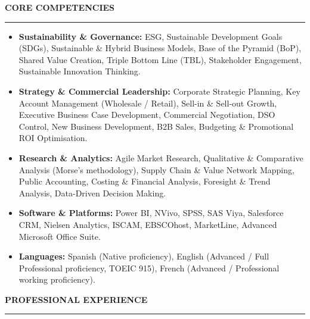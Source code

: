 \documentclass[10pt,a4paper]{article}
\newcommand{\cvsection}[1]{%
  \vspace{0.6em}%
  {\large\bfseries #1}\par
  \vspace{-0.45em}%
  \rule{\textwidth}{0.6pt}\par
  \vspace{0.25em}%
}
\begin{document}
\cvsection{CORE COMPETENCIES}
\begin{itemize}
  \item \textbf{Sustainability \& Governance:} ESG, Sustainable Development Goals (SDGs), Sustainable \& Hybrid Business Models, Base of the Pyramid (BoP), Shared Value Creation, Triple Bottom Line (TBL), Stakeholder Engagement, Sustainable Innovation Thinking.
  \item \textbf{Strategy \& Commercial Leadership:} Corporate Strategic Planning, Key Account Management (Wholesale / Retail), Sell-in \& Sell-out Growth, Executive Business Case Development, Commercial Negotiation, DSO Control, New Business Development, B2B Sales, Budgeting \& Promotional ROI Optimisation.
  \item \textbf{Research \& Analytics:} Agile Market Research, Qualitative \& Comparative Analysis (Morse's methodology), Supply Chain \& Value Network Mapping, Public Accounting, Costing \& Financial Analysis, Foresight \& Trend Analysis, Data-Driven Decision Making.
  \item \textbf{Software \& Platforms:} Power BI, NVivo, SPSS, SAS Viya, Salesforce CRM, Nielsen Analytics, ISCAM, EBSCOhost, MarketLine, Advanced Microsoft Office Suite.
  \item \textbf{Languages:} Spanish (Native proficiency), English (Advanced / Full Professional proficiency, TOEIC 915), French (Advanced / Professional working proficiency).
\end{itemize}

\cvsection{PROFESSIONAL EXPERIENCE}
\end{document}
